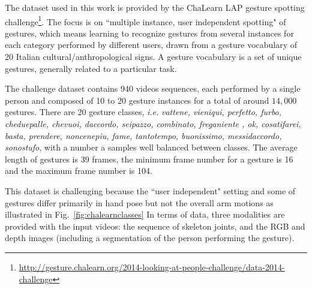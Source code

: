 The dataset used in this work is provided by the ChaLearn LAP \cite{chalearnLAP} gesture spotting challenge\footnote{\href{http://gesture.chalearn.org/2014-looking-at-people-challenge/data-2014-challenge}{http://gesture.chalearn.org/2014-looking-at-people-challenge/data-2014-challenge}}.
%
The focus  is on ``multiple instance, user independent spotting" of gestures, which means learning to recognize gestures from several instances for each category performed by different users, drawn from a gesture vocabulary of 20 Italian cultural/anthropological signs.
A gesture vocabulary is a set of unique gestures, generally related to a particular task.

The challenge dataset contains 940 videos sequences, each performed by a single person and composed of 10 to 20 gesture instances for a total of around $14,000$ gestures.
%
There are 20 gesture classes, \emph{i.e.} \emph{vattene, vieniqui, perfetto, furbo, cheduepalle, chevuoi, daccordo, seipazzo, combinato, freganiente
    , ok, cosatifarei, basta, prendere, noncenepiu, fame, tantotempo, buonissimo, messidaccordo, sonostufo}, with a number a samples well balanced between classes.
The average length of gestures is 39 frames, the minimum frame number for a gesture is 16  and the maximum frame number is 104.

This dataset is challenging because the ``user independent" setting and some of gestures differ primarily in hand pose but not the overall arm motions as illustrated in Fig.~\ref{fig:chalearnclasses}
In terms of data, three modalities are provided with the input videos: the sequence of skeleton joints, and the RGB and depth images
(including a segmentation of the person performing the gesture).

